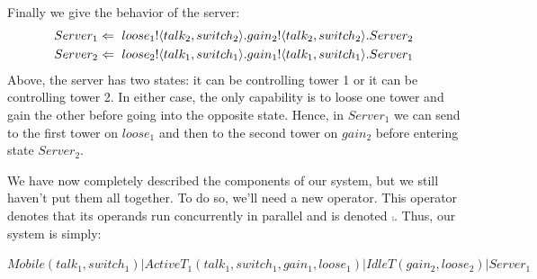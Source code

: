 Finally we give the behavior of the server:
\begin{align*}
	Server_1 \Leftarrow\  {loose_1}!\langle{talk_2,switch_2}\rangle. {gain_2}!\langle{talk_2,switch_2}\rangle. Server_2\\
	Server_2 \Leftarrow\  {loose_2}!\langle{talk_1,switch_1}\rangle. {gain_1}!\langle{talk_1,switch_1}\rangle. Server_1
\end{align*}
Above, the server has two states: it can be controlling tower 1 or it can be controlling tower 2.  In either case, the only capability is to loose one tower and gain the other before going into the opposite state.  Hence, in $Server_1$ we can send to the first tower on $loose_1$ and then to the second tower on $gain_2$ before entering state $Server_2$.

We have now completely described the components of our system, but we still haven't put them all together.  To do so, we'll need a new operator.  This operator denotes that its operands run concurrently in parallel and is denoted $\comp$.  Thus, our system is simply:
\begin{center}
	\small{$\textstyle Mobile(talk_1,switch_1)|ActiveT_1(talk_1,switch_1,gain_1,loose_1)|IdleT(gain_2,loose_2)|Server_1$}
\end{center}

	